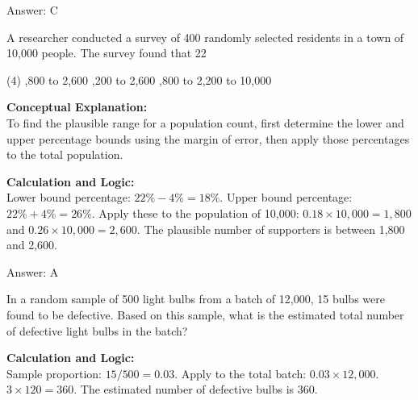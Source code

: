 \documentclass[11pt,paper=a4,answers]{exam}
\begin{document}
\begin{questions}
\begin{solution}
\vspace{30pt}

Answer: \colorbox{yellow!100}{C}
\end{solution}


\question
A researcher conducted a survey of 400 randomly selected residents in a town of 10,000 people. The survey found that 22%
\begin{tasks}(4)
    ,800 to 2,600
    ,200 to 2,600
    ,800 to 2,200
     to 10,000
\end{tasks}

\begin{solution}
\textbf{Conceptual Explanation:} \\
To find the plausible range for a population count, first determine the lower and upper percentage bounds using the margin of error, then apply those percentages to the total population.

\vspace{30pt}

\textbf{Calculation and Logic:} \\
Lower bound percentage: $22\% - 4\% = 18\%$. Upper bound percentage: $22\% + 4\% = 26\%$. Apply these to the population of 10,000: $0.18 \times 10,000 = 1,800$ and $0.26 \times 10,000 = 2,600$. The plausible number of supporters is between 1,800 and 2,600.

\vspace{30pt}

Answer: \colorbox{yellow!100}{A}
\end{solution}

\vspace{60pt}

\question
In a random sample of 500 light bulbs from a batch of 12,000, 15 bulbs were found to be defective. Based on this sample, what is the estimated total number of defective light bulbs in the batch?

\begin{solution}
\textbf{Calculation and Logic:} \\
Sample proportion: $15 / 500 = 0.03$. Apply to the total batch: $0.03 \times 12,000$. $3 \times 120 = 360$. The estimated number of defective bulbs is 360.


\end{solution}
\end{questions}
\end{document}
